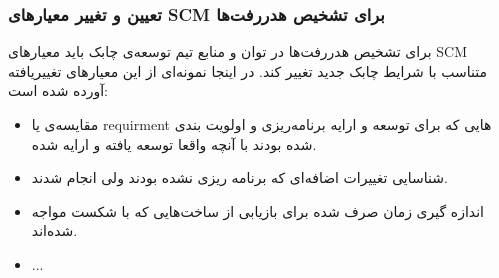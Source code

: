 \subsubsection{تعیین و تغییر معیار‌های SCM برای تشخیص هدررفت‌ها}
برای تشخیص هدررفت‌ها در توان و منابع تیم توسعه‌ی چابک باید معیار‌های SCM متناسب با شرایط چابک جدید تغییر کند. در اینجا نمونه‌ای از این معیار‌های تغییریافته آورده شده است:
\begin{itemize}
\item 
مقایسه‌ی  یا requirment هایی که برای توسعه و ارایه برنامه‌ریزی و اولویت بندی شده بودند با آنچه واقعا توسعه یافته و ارایه شده.
\item 
شناسایی تغییرات اضافه‌ای که برنامه ریزی نشده بودند ولی انجام شدند.
\item
اندازه گیری زمان صرف شده برای بازیابی از ساخت‌هایی که با شکست مواجه شده‌اند.
\item
...
\end{itemize}


\cite{cms-agile}